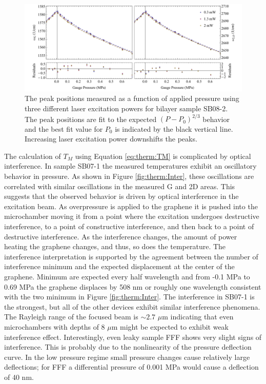 \begin{figure}
	\begin{center}
	\includegraphics[scale=0.6]{Figs_Thermal/PeakPressure.pdf}
	\end{center}
	\caption[Pressure dependent peak positions]{\label{fig:therm:PeakPressure}
		The peak positions measured as a function of applied pressure using three different laser excitation powers for bilayer sample SB08-2.
		The peak positions are fit to the expected $(P-P_0)^{2/3}$ behavior and the best fit value for $P_0$ is indicated by the black vertical line.
		Increasing laser excitation power downshifts the peaks.
	}
\end{figure}

The calculation of $T_M$ using Equation \ref{eq:therm:TM} is complicated by optical interference.
In sample SB07-1 the measured temperatures exhibit an oscillatory behavior in pressure.
As shown in Figure \ref{fig:therm:Inter}, these oscillations are correlated with similar oscillations in the measured G and 2D areas.
This suggests that the observed behavior is driven by optical interference in the excitation beam.
As overpressure is applied to the graphene it is pushed into the microchamber moving it from a point where the excitation undergoes destructive interference, to a point of constructive interference, and then back to a point of destructive interference.
As the interference changes, the amount of power heating the graphene changes, and thus, so does the temperature.
The interference interpretation is supported by the agreement between the number of interference minimum and the expected displacement at the center of the graphene.
Minimum are expected every half wavelength and from -0.1 MPa to 0.69 MPa the graphene displaces by 508 nm or roughly one wavelength consistent with the two minimum in Figure \ref{fig:therm:Inter}.
The interference in SB07-1 is the strongest, but all of the other devices exhibit similar interference phenomena.
The Rayleigh range of the focused beam is $\sim 2.7$ $\mu$m indicating that even microchambers with depths of 8 $\mu$m might be expected to exhibit weak interference effect.
Interestingly, even leaky sample FFF shows very slight signs of interference.
This is probably due to the nonlinearity of the pressure deflection curve.
In the low pressure regime small pressure changes cause relatively large deflections; for FFF a differential pressure of 0.001 MPa would cause a deflection of 40 nm.

